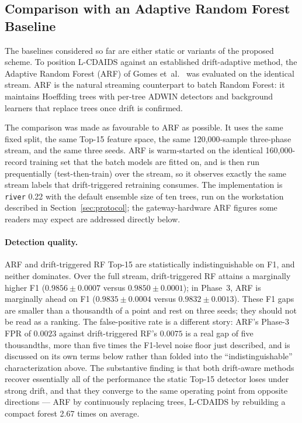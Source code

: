 \documentclass[11pt,a4paper]{article}
\begin{document}
\subsection{Comparison with an Adaptive Random Forest Baseline}
\label{sec:arf}

The baselines considered so far are either static or variants of the
proposed scheme. To position L-CDAIDS against an established
drift-adaptive method, the Adaptive Random Forest (ARF) of Gomes
et~al.\ \cite{gomes2017} was evaluated on the identical stream. ARF is
the natural streaming counterpart to batch Random Forest: it maintains
Hoeffding trees with per-tree ADWIN detectors and background learners
that replace trees once drift is confirmed.

The comparison was made as favourable to ARF as possible. It uses the
same fixed split, the same Top-15 feature space, the same 120{,}000-sample
three-phase stream, and the same three seeds. ARF is warm-started on the
identical 160{,}000-record training set that the batch models are fitted
on, and is then run prequentially (test-then-train) over the stream, so
it observes exactly the same stream labels that drift-triggered
retraining consumes. The implementation is \texttt{river} 0.22 with the
default ensemble size of ten trees, run on the workstation described in
Section~\ref{sec:protocol}; the gateway-hardware ARF figures some readers
may expect are addressed directly below.

\paragraph{Detection quality.} ARF and drift-triggered RF Top-15 are
statistically indistinguishable on F1, and neither dominates. Over the
full stream, drift-triggered RF attains a marginally higher F1
($0.9856 \pm 0.0007$ versus $0.9850 \pm 0.0001$); in Phase~3, ARF is
marginally ahead on F1 ($0.9835 \pm 0.0004$ versus
$0.9832 \pm 0.0013$). These F1 gaps are smaller than a thousandth of a
point and rest on three seeds; they should not be read as a ranking.
The false-positive rate is a different story: ARF's Phase-3 FPR of
$0.0023$ against drift-triggered RF's $0.0075$ is a real gap of five
thousandths, more than five times the F1-level noise floor just
described, and is discussed on its own terms below rather than folded
into the ``indistinguishable'' characterization above. The substantive
finding is that both drift-aware methods
recover essentially all of the performance the static Top-15 detector
loses under strong drift, and that they converge to the same operating
point from opposite directions --- ARF by continuously replacing trees,
L-CDAIDS by rebuilding a compact forest 2.67 times on average.
\end{document}
